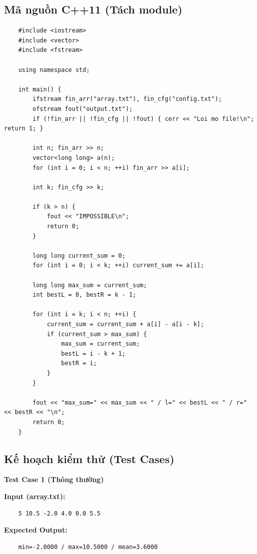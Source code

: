 \subsection{Mã nguồn C++11 (Tách module)}
    \begin{lstlisting}
    #include <iostream>
    #include <vector>
    #include <fstream>

    using namespace std;

    int main() {
        ifstream fin_arr("array.txt"), fin_cfg("config.txt");
        ofstream fout("output.txt");
        if (!fin_arr || !fin_cfg || !fout) { cerr << "Loi mo file!\n"; return 1; }

        int n; fin_arr >> n;
        vector<long long> a(n);
        for (int i = 0; i < n; ++i) fin_arr >> a[i];

        int k; fin_cfg >> k;

        if (k > n) {
            fout << "IMPOSSIBLE\n";
            return 0;
        }

        long long current_sum = 0;
        for (int i = 0; i < k; ++i) current_sum += a[i];

        long long max_sum = current_sum;
        int bestL = 0, bestR = k - 1;

        for (int i = k; i < n; ++i) {
            current_sum = current_sum + a[i] - a[i - k];
            if (current_sum > max_sum) {
                max_sum = current_sum;
                bestL = i - k + 1;
                bestR = i;
            }
        }

        fout << "max_sum=" << max_sum << " / l=" << bestL << " / r=" << bestR << "\n";
        return 0;
    }
\end{lstlisting}

\subsection{Kế hoạch kiểm thử (Test Cases)}

    \textbf{Test Case 1 (Thông thường)}

    \textbf{Input (array.txt):}
    \begin{lstlisting}
    5 10.5 -2.0 4.0 0.0 5.5\end{lstlisting}

    \textbf{Expected Output:}
    \begin{lstlisting}
    min=-2.0000 / max=10.5000 / mean=3.6000\end{lstlisting}

    \vspace{0.5cm}

